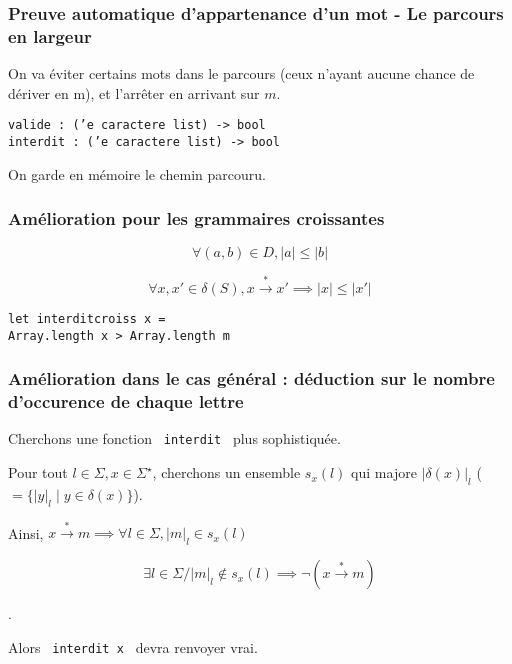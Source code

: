 \documentclass[12pt]{beamer}
\newcommand{\norm}[1]{\lvert #1 \rvert}
\begin{document}
\begin{frame}\frametitle{Preuve automatique d'appartenance d'un mot - Le parcours en largeur}
On va éviter certains mots dans le parcours (ceux n'ayant aucune chance de dériver en m), et l'arrêter en arrivant sur $m$.

{\small \color{DarkBlue}\texttt{valide : ('e caractere list) -> bool\\
interdit : ('e caractere list) -> bool\\}}

On garde en mémoire le chemin parcouru.

\end{frame}

\begin{frame}\frametitle{Amélioration pour les grammaires croissantes}

\begin{equation*}\forall (a,b) \in D, \norm{a} \leq \norm{b} \end{equation*}

\begin{equation*}\forall x, x' \in \delta (S), x \overset{*}{\rightarrow} x' \implies \norm{x} \leq \norm{x'}\end{equation*}

{\small \color{DarkBlue}\texttt{let interditcroiss x = \\Array.length x > Array.length m}}
\end{frame}

\begin{frame}\frametitle{Amélioration dans le cas général : déduction sur le nombre d’occurence de chaque lettre}
Cherchons une fonction \texttt{ interdit } plus sophistiquée.

Pour tout $l \in \Sigma, x \in \Sigma^\star$, cherchons un ensemble $s_x(l)$ qui majore $\norm{\delta(x)}_l$ ($=\{\norm{y}_l \mid y \in \delta(x)\}$).

Ainsi, $x \overset{*}{\rightarrow} m \implies \forall l \in \Sigma, \norm{m}_l \in s_x(l)$

\begin{equation*}
\exists l \in \Sigma / \norm{m}_l \notin s_x(l) \implies \neg (x \overset{*}{\rightarrow} m)
\end{equation*}

\fbox{$\forall x \in \delta(S)$, $\exists l \in \Sigma, \norm{m}_l \notin s_x(l) \implies m \notin \delta(x)$}.

Alors \texttt{ interdit x } devra renvoyer vrai.
\end{frame}
\end{document}
